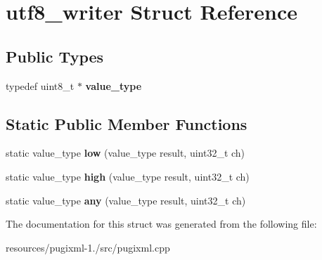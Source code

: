 \hypertarget{structutf8__writer}{\section{utf8\+\_\+writer Struct Reference}
\label{structutf8__writer}
}
\subsection*{Public Types}
\begin{DoxyCompactItemize}
\item 
\hypertarget{structutf8__writer_af25ec3c651f9a4a3f193573a4e95002b}{typedef uint8\+\_\+t $\ast$ {\bfseries value\+\_\+type}}\label{structutf8__writer_af25ec3c651f9a4a3f193573a4e95002b}

\end{DoxyCompactItemize}
\subsection*{Static Public Member Functions}
\begin{DoxyCompactItemize}
\item 
\hypertarget{structutf8__writer_ac4ec52da6f37225ba4fde259bff2f86c}{static value\+\_\+type {\bfseries low} (value\+\_\+type result, uint32\+\_\+t ch)}\label{structutf8__writer_ac4ec52da6f37225ba4fde259bff2f86c}

\item 
\hypertarget{structutf8__writer_ac03dfaf797d599afdf0be7def86ff9b9}{static value\+\_\+type {\bfseries high} (value\+\_\+type result, uint32\+\_\+t ch)}\label{structutf8__writer_ac03dfaf797d599afdf0be7def86ff9b9}

\item 
\hypertarget{structutf8__writer_a288e9c5f3720b95ae6b77330ad38dd56}{static value\+\_\+type {\bfseries any} (value\+\_\+type result, uint32\+\_\+t ch)}\label{structutf8__writer_a288e9c5f3720b95ae6b77330ad38dd56}

\end{DoxyCompactItemize}


The documentation for this struct was generated from the following file\+:\begin{DoxyCompactItemize}
\item 
resources/pugixml-\/1./src/pugixml.\+cpp\end{DoxyCompactItemize}
